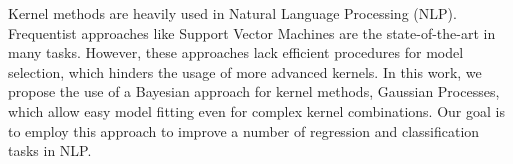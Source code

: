 Kernel methods are heavily used in Natural Language Processing (NLP). Frequentist approaches like Support Vector Machines are the state-of-the-art in many tasks. However, these approaches lack efficient procedures for model selection, which hinders the usage of more advanced kernels. In this work, we propose the use of a Bayesian approach for kernel methods, Gaussian Processes, which allow easy model fitting even for complex kernel combinations. Our goal is to employ this approach to improve a number of regression and classification tasks in NLP.
